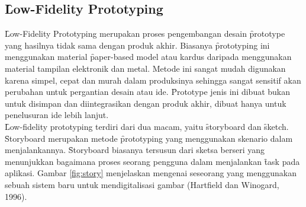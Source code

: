 \subsection{\f{Low-Fidelity Prototyping}}
\f{Low-Fidelity Prototyping} merupakan proses pengembangan desain \f{prototype} yang hasilnya tidak sama dengan produk akhir. Biasanya \f{prototyping} ini menggunakan material \f{paper-based model} atau kardus daripada menggunakan material tampilan elektronik dan metal. Metode ini sangat mudah digunakan karena simpel, cepat dan murah dalam produksinya sehingga sangat sensitif akan perubahan untuk pergantian desain atau ide. \f{Prototype} jenis ini dibuat bukan untuk disimpan dan diintegrasikan dengan produk akhir, dibuat hanya untuk penelusuran ide lebih lanjut. 
\newline\\
\f{Low-fidelity prototyping} terdiri dari dua macam, yaitu \f{storyboard} dan \f{sketch}. \f{Storyboard} merupakan metode \f{prototyping} yang menggunakan skenario dalam menjalankannya. \f{Storyboard} biasanya tersusun dari sketsa berseri yang menunjukkan bagaimana proses seorang pengguna dalam menjalankan \f{task} pada aplikasi. Gambar \ref{fig:story} menjelaskan mengenai seseorang yang menggunakan sebuah sistem baru untuk mendigitalisasi gambar (Hartfield dan Winogard, 1996).

